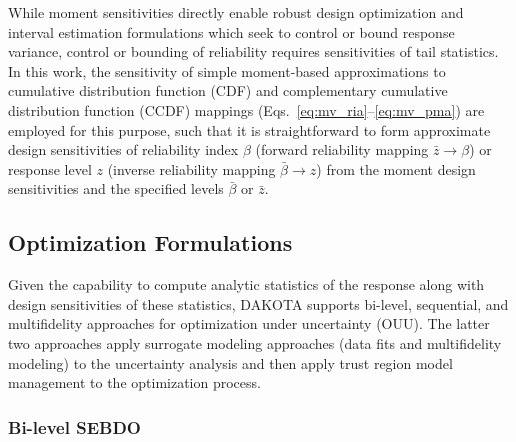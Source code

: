 While moment sensitivities directly enable robust design optimization
and interval estimation formulations which seek to control or bound
response variance, control or bounding of reliability requires
sensitivities of tail statistics.  In this work, the sensitivity of
simple moment-based approximations to cumulative distribution function
(CDF) and complementary cumulative distribution function (CCDF)
mappings (Eqs.~\ref{eq:mv_ria}--\ref{eq:mv_pma}) are employed for this
purpose, such that it is straightforward to form approximate design
sensitivities of reliability index $\beta$ (forward reliability
mapping $\bar{z} \rightarrow \beta$) or response level $z$ (inverse
reliability mapping $\bar{\beta} \rightarrow z$) from the moment
design sensitivities and the specified levels $\bar{\beta}$ or
$\bar{z}$.
%


\subsection{Optimization Formulations} \label{ouu:sebdo:form}

Given the capability to compute analytic statistics of the response
along with design sensitivities of these statistics, DAKOTA supports
bi-level, sequential, and multifidelity approaches for optimization
under uncertainty (OUU). %
The latter two approaches apply surrogate modeling approaches (data 
fits and multifidelity modeling) to the uncertainty analysis and then 
apply trust region model management to the optimization process.

\subsubsection{Bi-level SEBDO} \label{ouu:sebdo:form:bilev}

